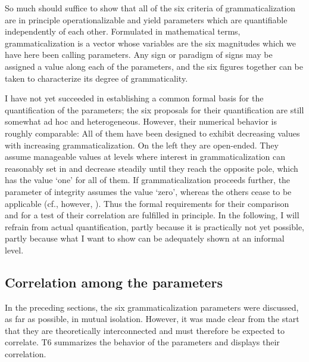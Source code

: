So much should suffice to show that all of the six criteria of grammaticalization are in principle operationalizable and yield parameters which are quantifiable independently of each other. Formulated in mathematical terms, grammaticalization is a vector whose variables are the six magnitudes which we have here been calling parameters. Any sign or paradigm of signs may be assigned a value along each of the parameters, and the six figures together can be taken to characterize its degree of grammaticality.

I have not yet succeeded in establishing a common formal basis for the quantification of the parameters; the six proposals for their quantification are still somewhat ad hoc and heterogeneous. However, their numerical behavior is roughly comparable: All of them have been designed to exhibit decreasing values with increasing grammaticalization. On the left they are open-ended. They assume manageable values at levels where interest in grammaticalization can reasonably set in and decrease steadily until they reach the opposite pole, which has the value ‘one’ for all of them. If grammaticalization proceeds further, the parameter of integrity assumes the value ‘zero’, whereas the others cease to be applicable (cf., however, ). Thus the formal requirements for their comparison and for a test of their correlation are fulfilled in principle. In the following, I will refrain from actual quantification, partly because it is practically not yet possible, partly because what I want to show can be adequately shown at an informal level.

\subsection{Correlation among the parameters}

In the preceding sections, the six grammaticalization parameters were discussed, as far as possible, in mutual isolation. However, it was made clear from the start that they are theoretically interconnected and must therefore be expected to correlate. T6 summarizes the behavior of the parameters and displays their correlation.


